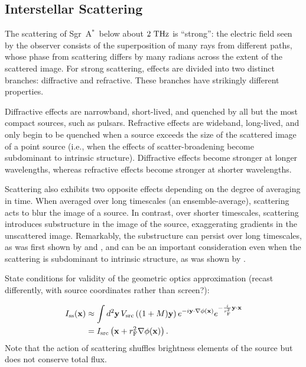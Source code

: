 \documentclass[11pt,preprint]{aastex}
\newcommand{\sgra}{Sgr~A$^{\ast}$}
\begin{document}
\subsection{Interstellar Scattering}

The scattering of \sgra\ below about $2~{\rm THz}$ is ``strong'': the electric 
field seen by the observer consists of the superposition of many rays from 
different paths, whose phase from scattering differs by many radians across 
the extent of the scattered image.  For strong scattering, effects are divided 
into two distinct branches: diffractive and refractive. These branches have 
strikingly different properties.

Diffractive effects are narrowband, short-lived, and quenched by all but the 
most compact sources, such as pulsars.  Refractive effects are wideband, 
long-lived, and only begin to be quenched when a source exceeds the size of the 
scattered image of a point source (i.e., when the effects of scatter-broadening 
become subdominant to intrinsic structure).  Diffractive effects become stronger
at longer wavelengths, whereas refractive effects become stronger at shorter 
wavelengths.

Scattering also exhibits two opposite effects depending on the degree of 
averaging in time.  When averaged over long timescales (an ensemble-average), 
scattering acts to blur the image of a source.  In contrast, over shorter 
timescales, scattering introduces substructure in the image of the source, 
exaggerating gradients in the unscattered image.  Remarkably, the substructure 
can persist over long timescales, as was first shown by 
\citet{ng89} and \citet{gn89}, and can be an important consideration even when 
the scattering is subdominant to intrinsic structure, as was shown by 
\citet[][hereafter JG15]{jg15}. 
  
State conditions for validity of the geometric optics approximation (recast 
differently, with source coordinates rather than screen?):   

\begin{align}
\label{eq::Image_Approx}
\nonumber I_{\rm ss}(\textbf{x}) &\approx \int d^2\textbf{y}\, 
V_{\rm src}\left( (1+M) \textbf{y} \right)
e^{-i \textbf{y} \cdot \nabla \phi(\textbf{x}) }
e^{-\frac{i}{r_{\rm F}^{2}} \textbf{y}\cdot \textbf{x} }\\
&=I_{\rm src}\left( \textbf{x} + r_{\rm F}^2 \nabla \phi(\textbf{x}) \right).
\end{align}
Note that the action of scattering shuffles brightness elements of the source 
but does not conserve total flux.
\end{document}
